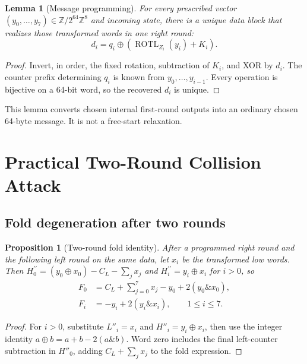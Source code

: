 \documentclass[10pt]{article}
\newtheorem{lemma}{Lemma}
\newtheorem{proposition}{Proposition}
\theoremstyle{definition}
\newcommand{\W}{\mathbb{Z}/2^{64}\mathbb{Z}}
\newcommand{\ROTL}{\operatorname{ROTL}}
\begin{document}
\begin{lemma}[Message programming]\label{lem:program}
For every prescribed vector $(y_0,\ldots,y_7)\in\W^8$ and incoming state, there is a unique data block that realizes those transformed words in one right round:
\begin{equation}
  d_i=q_i\oplus\left(\ROTL_{Z_i}(y_i)+K_i\right).
  \label{eq:program}
\end{equation}
\end{lemma}

\begin{proof}
Invert, in order, the fixed rotation, subtraction of $K_i$, and XOR by $d_i$. The counter prefix determining $q_i$ is known from $y_0,\ldots,y_{i-1}$. Every operation is bijective on a 64-bit word, so the recovered $d_i$ is unique.
\end{proof}

This lemma converts chosen internal first-round outputs into an ordinary chosen 64-byte message. It is not a free-start relaxation.

\section{Practical Two-Round Collision Attack}
\label{sec:collision}

\subsection{Fold degeneration after two rounds}

\begin{proposition}[Two-round fold identity]\label{prop:fold}
After a programmed right round and the following left round on the same data, let $x_i$ be the transformed low words. Then $H^{\prime\prime}_0=(y_0\oplus x_0)-C_L-\sum_jx_j$ and $H^{\prime\prime}_i=y_i\oplus x_i$ for $i>0$, so
\begin{align}
  F_0 &= C_L+\sum_{j=0}^{7}x_j-y_0+2(y_0\mathbin{\&}x_0), \\
  F_i &= -y_i+2(y_i\mathbin{\&}x_i),\qquad 1\leq i\leq 7.
  \label{eq:foldidentity}
\end{align}
\end{proposition}

\begin{proof}
For $i>0$, substitute $L''_i=x_i$ and $H''_i=y_i\oplus x_i$, then use the integer identity $a\oplus b=a+b-2(a\mathbin{\&}b)$. Word zero includes the final left-counter subtraction in $H''_0$, adding $C_L+\sum_jx_j$ to the fold expression.
\end{proof}
\end{document}
